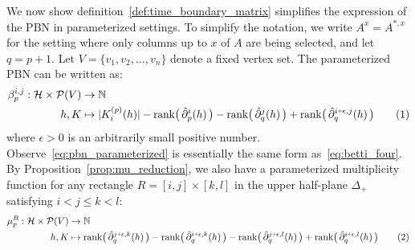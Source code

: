 \documentclass[10pt]{article}
\numberwithin{equation}{section}
\newcommand{\+}{%
	\raisebox{0.18ex}{\scaleobj{0.55}{+}}
}
\theoremstyle{definition}
\newcommand\numberthis{\addtocounter{equation}{1}\tag{\theequation}}
\begin{document}
\noindent
We now show definition~\ref{def:time_boundary_matrix} simplifies the expression of the PBN in parameterized settings. To simplify the notation, we write $A^{x} = A^{\ast,x}$ for the setting where only columns up to $x$ of $A$ are being selected, and let $q = p + 1$. 
Let $V = \{ v_1, v_2, \dots, v_n\}$ denote a fixed vertex set. The parameterized PBN can be written as: 
\begin{align*}\label{eq:pbn_parameterized}
	\beta_p^{i,j} : \mathcal{H} \times \mathcal{P}(V) &\to \mathbb{N} \\
	h, K &\mapsto \lvert K_i^{(p)}(h) \rvert - \mathrm{rank}\big(\,\hat{\partial}_{p}^{i}(h)\,\big) - \mathrm{rank}\big(\,\hat{\partial}_{q}^{j}(h)\,\big) + \mathrm{rank}\big(\,\hat{\partial}_{q}^{i \+ \epsilon, j}(h)\,\big) \numberthis
\end{align*}
where $\epsilon > 0$ is an arbitrarily small positive number. Observe~\eqref{eq:pbn_parameterized} is essentially the same form as~\eqref{eq:betti_four}. 
By Proposition~\ref{prop:mu_reduction}, we also have a parameterized multiplicity function for any rectangle $R = [i,j] \times [k,l]$ in the upper half-plane $\Delta_{+}$ satisfying $i < j \leq k < l$: 
\begin{align*}\label{eq:mu_parameterized}
	\mu_p^{R} : \mathcal{H} \times \mathcal{P}(V) &\to \mathbb{N} \\
	h, K & \mapsto  \mathrm{rank}\big(\,\hat{\partial}_{q}^{j \+ \epsilon, k}(h)\,\big) - \mathrm{rank}\big(\,\hat{\partial}_{q}^{i \+ \epsilon, k}(h)\,\big) - \mathrm{rank}\big(\,\hat{\partial}_{q}^{j \+ \epsilon, l}(h)\,\big) + \mathrm{rank}\big(\, \hat{\partial}_{q}^{i \+ \epsilon, l}(h)\,\big) \numberthis
\end{align*}


\end{document}
